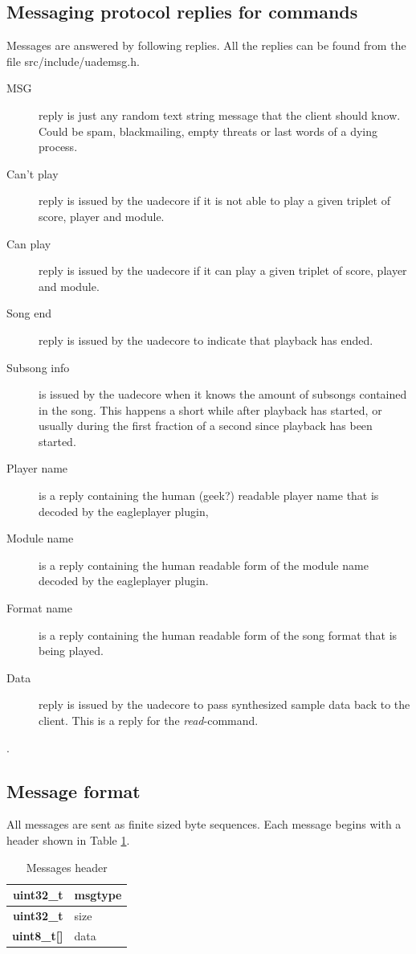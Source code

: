 \documentclass{article}
\begin{document}
\subsection{Messaging protocol replies for commands}

Messages are answered by following replies.
All the replies can be found from the file \mbox{src/include/uademsg.h}.

\begin{description}
\item [MSG] reply is just any random text string message that the client should
know. Could be spam, blackmailing, empty threats or last words of a dying
process.
\item [Can't play] reply is issued by the uadecore if it is not able to play
a given triplet of score, player and module.
\item [Can play] reply is issued by the uadecore if it can play a given
triplet of score, player and module.
\item [Song end] reply is issued by the uadecore to indicate that playback
has ended.
\item [Subsong info] is issued by the uadecore when it knows the amount of
subsongs contained in the song. This happens a short while after playback
has started, or usually during the first fraction of a second since
playback has been started.
\item [Player name] is a reply containing the human (geek?) readable player
name that is decoded by the eagleplayer plugin,
\item [Module name] is a reply containing the human readable form of the
module name decoded by the eagleplayer plugin.
\item [Format name] is a reply containing the human readable form
of the song format that is being played.
\item [Data] reply is issued by the uadecore to pass synthesized sample
data back to the client. This is a reply for the \emph{read}-command.
\end{description}.

\subsection{Message format}
All messages are sent as finite sized byte sequences. Each message begins
with a header shown in Table \ref{tab:message_header}.

\begin{table}
\begin{center}
\caption{Messages header}
\label{tab:message_header}
\begin{tabular}{|r|l|}
\hline
\textbf{uint32\_t} & msgtype \\
\hline
\textbf{uint32\_t} & size \\
\hline
\textbf{uint8\_t[]} & data \\
\hline
\end{tabular}
\end{center}
\end{table}
\end{document}
